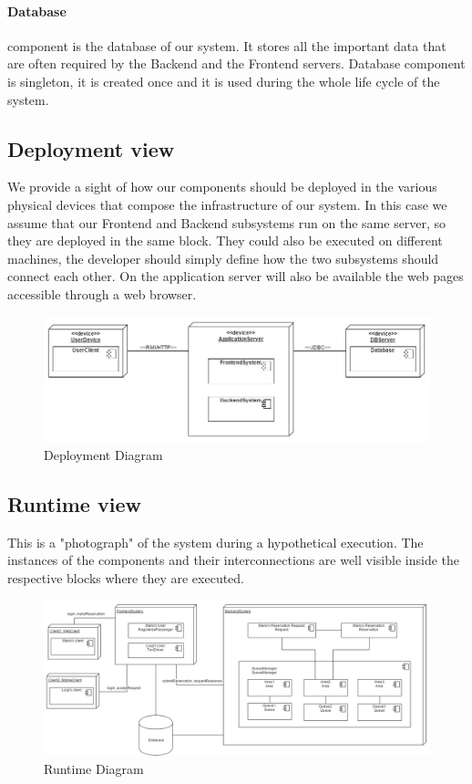 		\paragraph{Database} component is the database of our system. It stores all the important data that are often required by the Backend and the Frontend servers. Database component is singleton, it is created once and it is used during the whole life cycle of the system.
	\begin{landscape}
	\subsection{Deployment view}
	We provide a sight of how our components should be deployed in the various physical devices that compose the
	infrastructure of our system. In this case we assume that our Frontend and Backend subsystems run on the same
	server, so they are deployed in the same block. They could also be executed on different machines, the developer
	should simply define how the two subsystems should connect each other. On the application server will also
	be available the web pages accessible through a web browser.
		\begin{figure}[h!]
			\begin{center}
				\includegraphics[width=0.9\linewidth]{../SE2_IMAGES/DeploymentDiagram}
				\caption{Deployment Diagram}
			\end{center}
		\end{figure}
	\end{landscape}
	\newpage
	\begin{landscape}
	\subsection{Runtime view}
	This is a "photograph" of the system during a hypothetical execution. The instances of the components and
	their interconnections are well visible inside the respective blocks where they are executed.
		\begin{figure}[h!]
			\begin{center}
				\includegraphics[width=0.9\linewidth]{../SE2_IMAGES/RuntimeDiagram}
				\caption{Runtime Diagram}
			\end{center}
		\end{figure}
	\end{landscape}
	\newpage
